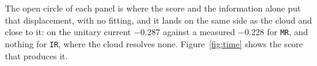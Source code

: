 The open circle of each panel is where the score and the information alone put that displacement,
with no fitting, and it lands on the same side as the cloud and close to it: on the unitary current
$-0.287$ against a measured $-0.228$ for \texttt{MR}, and nothing for \texttt{IR}, where the cloud
resolves none. Figure~\ref{fig:time} shows the score that produces it. %

